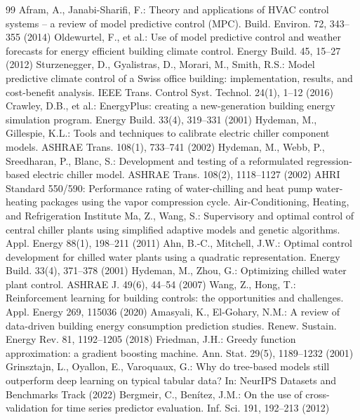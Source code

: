 \documentclass{svproc}
\begin{document}
\begin{thebibliography}{99}
 Afram, A., Janabi-Sharifi, F.: Theory and applications of HVAC control systems -- a review of model predictive control (MPC). Build. Environ. 72, 343--355 (2014)
 Oldewurtel, F., et al.: Use of model predictive control and weather forecasts for energy efficient building climate control. Energy Build. 45, 15--27 (2012)
 Sturzenegger, D., Gyalistras, D., Morari, M., Smith, R.S.: Model predictive climate control of a Swiss office building: implementation, results, and cost-benefit analysis. IEEE Trans. Control Syst. Technol. 24(1), 1--12 (2016)
 Crawley, D.B., et al.: EnergyPlus: creating a new-generation building energy simulation program. Energy Build. 33(4), 319--331 (2001)
 Hydeman, M., Gillespie, K.L.: Tools and techniques to calibrate electric chiller component models. ASHRAE Trans. 108(1), 733--741 (2002)
 Hydeman, M., Webb, P., Sreedharan, P., Blanc, S.: Development and testing of a reformulated regression-based electric chiller model. ASHRAE Trans. 108(2), 1118--1127 (2002)
 AHRI Standard 550/590: Performance rating of water-chilling and heat pump water-heating packages using the vapor compression cycle. Air-Conditioning, Heating, and Refrigeration Institute
 Ma, Z., Wang, S.: Supervisory and optimal control of central chiller plants using simplified adaptive models and genetic algorithms. Appl. Energy 88(1), 198--211 (2011)
 Ahn, B.-C., Mitchell, J.W.: Optimal control development for chilled water plants using a quadratic representation. Energy Build. 33(4), 371--378 (2001)
 Hydeman, M., Zhou, G.: Optimizing chilled water plant control. ASHRAE J. 49(6), 44--54 (2007)
 Wang, Z., Hong, T.: Reinforcement learning for building controls: the opportunities and challenges. Appl. Energy 269, 115036 (2020)
 Amasyali, K., El-Gohary, N.M.: A review of data-driven building energy consumption prediction studies. Renew. Sustain. Energy Rev. 81, 1192--1205 (2018)
 Friedman, J.H.: Greedy function approximation: a gradient boosting machine. Ann. Stat. 29(5), 1189--1232 (2001)
 Grinsztajn, L., Oyallon, E., Varoquaux, G.: Why do tree-based models still outperform deep learning on typical tabular data? In: NeurIPS Datasets and Benchmarks Track (2022)
 Bergmeir, C., Ben\'itez, J.M.: On the use of cross-validation for time series predictor evaluation. Inf. Sci. 191, 192--213 (2012)

\end{thebibliography}
\end{document}
